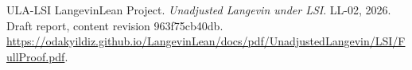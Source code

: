 \documentclass[11pt,a4paper]{article}
\begin{document}
\begin{thebibliography}{ULA-LSI}
LangevinLean Project. \emph{Unadjusted Langevin under LSI}. LL-02, 2026. Draft report, content revision 963f75cb40db. \url{https://odakyildiz.github.io/LangevinLean/docs/pdf/UnadjustedLangevin/LSI/FullProof.pdf}.
\end{thebibliography}
\end{document}
